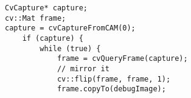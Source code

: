 \begin{lstlisting}
CvCapture* capture;
cv::Mat frame;
capture = cvCaptureFromCAM(0);
	if (capture) {
		while (true) {
			frame = cvQueryFrame(capture);
			// mirror it
			cv::flip(frame, frame, 1);
			frame.copyTo(debugImage);
\end{lstlisting}